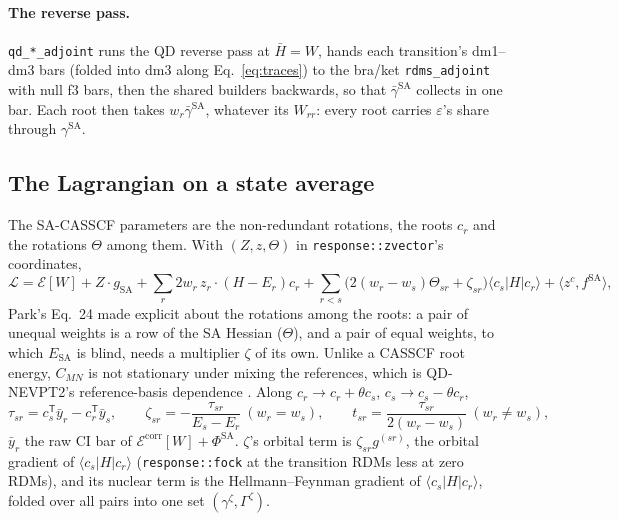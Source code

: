 \documentclass[11pt]{article}
\newcommand{\code}[1]{\texttt{#1}}
\newcommand{\eps}{\varepsilon}
\newcommand{\T}{\mathsf T}
\begin{document}
\paragraph{The reverse pass.} \code{qd\_*\_adjoint} runs the QD reverse pass at
$\bar H = W$, hands each transition's dm1--dm3 bars (folded into dm3 along
Eq.~\eqref{eq:traces}) to the bra/ket \code{rdms\_adjoint} with null f3
bars, then the shared builders backwards, so that $\bar\gamma^{\mathrm{SA}}$
collects in one bar. Each root then takes $w_r\bar\gamma^{\mathrm{SA}}$, whatever
its $W_{rr}$: every root carries $\eps$'s share through $\gamma^{\mathrm{SA}}$.

\subsection{The Lagrangian on a state average}

The SA-CASSCF parameters are the non-redundant rotations, the roots $c_r$
and the rotations $\Theta$ among them. With $(Z, z, \Theta)$ in
\code{response::zvector}'s coordinates,
\begin{equation}
  \mathcal L = \mathcal E[W] + Z\cdot g_{\mathrm{SA}} + \sum_r 2w_r\,z_r\cdot(H - E_r)c_r
  + \sum_{r<s}\bigl(2(w_r - w_s)\Theta_{sr} + \zeta_{sr}\bigr)\langle c_s|H|c_r\rangle
  + \langle z^c, f^{\mathrm{SA}}\rangle,
  \label{eq:qdL}
\end{equation}
Park's Eq.~24 \cite{park2020} made explicit about the rotations among the
roots: a pair of unequal weights is a row of the SA Hessian ($\Theta$), and
a pair of equal weights, to which $E_{\mathrm{SA}}$ is blind, needs a
multiplier $\zeta$ of its own. Unlike a CASSCF root energy, $C_{MN}$ is not
stationary under mixing the references, which is QD-NEVPT2's
reference-basis dependence \cite{granovsky2011}. Along $c_r \to c_r +
\theta c_s$, $c_s \to c_s - \theta c_r$,
\begin{equation}
  \tau_{sr} = c_s^\T\bar y_r - c_r^\T\bar y_s,\qquad
  \zeta_{sr} = -\frac{\tau_{sr}}{E_s - E_r}\ (w_r = w_s),\qquad
  t_{sr} = \frac{\tau_{sr}}{2(w_r - w_s)}\ (w_r\ne w_s),
  \label{eq:qd-tau}
\end{equation}
$\bar y_r$ the raw CI bar of $\mathcal E^{\mathrm{corr}}[W] + \Phi^{\mathrm{SA}}$.
$\zeta$'s orbital term is $\zeta_{sr}g^{(sr)}$, the orbital gradient of
$\langle c_s|H|c_r\rangle$ (\code{response::fock} at the transition RDMs less
at zero RDMs), and its nuclear term is the Hellmann--Feynman gradient of
$\langle c_s|H|c_r\rangle$, folded over all pairs into one set
$(\gamma^\zeta, \Gamma^\zeta)$.
\end{document}
